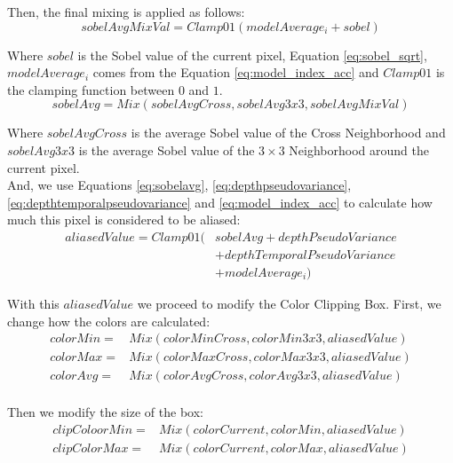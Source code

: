 \documentclass{cslthse-msc}
\begin{document}
Then, the final mixing is applied as follows:
\begin{equation}\label{eq:sobelavgmixval}
sobelAvgMixVal=Clamp01(modelAverage_i+sobel) 
\end{equation}
 
Where $sobel$ is the Sobel value of the current pixel, Equation \ref{eq:sobel_sqrt}, $modelAverage_i$ comes from the Equation \ref{eq:model_index_acc} and $Clamp01$ is the clamping function between $0$ and $1$. \\

\begin{equation}\label{eq:sobelavg}
sobelAvg=Mix(sobelAvgCross, sobelAvg3x3, sobelAvgMixVal)
\end{equation}

Where $sobelAvgCross$ is the average Sobel value of the Cross Neighborhood and $sobelAvg3x3$ is the average Sobel value of the $3\times 3$ Neighborhood around the current pixel. \\ 

And, we use Equations \ref{eq:sobelavg}, \ref{eq:depthpseudovariance}, \ref{eq:depthtemporalpseudovariance} and \ref{eq:model_index_acc} to calculate how much this pixel is considered to be aliased:
\begin{equation}\label{eq:aliasedvalue}
\begin{split}
aliasedValue=Clamp01 (& sobelAvg + depthPseudoVariance \\
 & + depthTemporalPseudoVariance \\
 & + modelAverage_i)
\end{split}
\end{equation}

With this $aliasedValue$ we proceed to modify the Color Clipping Box. First, we change how the colors are calculated:
\begin{equation}\label{eq:newcolors}
\begin{split}
colorMin= & Mix(colorMinCross,colorMin3x3,aliasedValue) \\
colorMax= & Mix(colorMaxCross,colorMax3x3,aliasedValue) \\
colorAvg= & Mix(colorAvgCross,colorAvg3x3,aliasedValue) \\
\end{split}
\end{equation}

Then we modify the size of the box:
\begin{equation}\label{eq:clipredux}
\begin{split}
	clipColoorMin= & Mix(colorCurrent,colorMin,aliasedValue) \\
	clipColorMax= & Mix(colorCurrent,colorMax,aliasedValue)
\end{split}
\end{equation}
\end{document}
